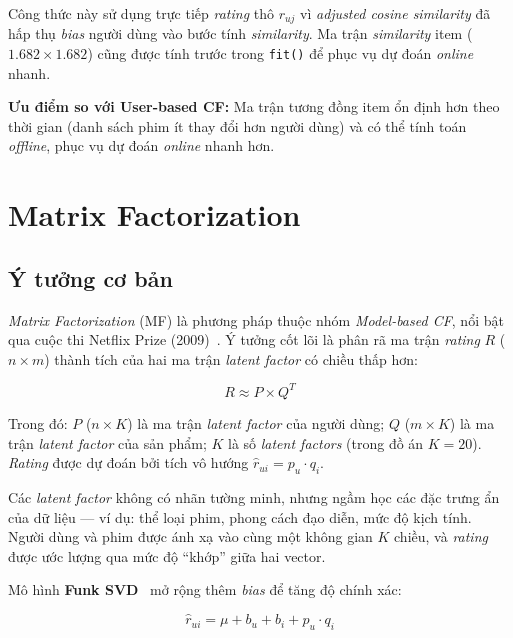 \documentclass[../BTL.tex]{subfiles}
\begin{document}
Công thức này sử dụng trực tiếp \textit{rating} thô $r_{uj}$ vì
\textit{adjusted cosine similarity} đã hấp thụ \textit{bias} người dùng vào bước
tính \textit{similarity}. Ma trận \textit{similarity} item ($1.682 \times 1.682$)
cũng được tính trước trong \texttt{fit()} để phục vụ dự đoán \textit{online} nhanh.

\textbf{Ưu điểm so với User-based CF:} Ma trận tương đồng item ổn định hơn theo thời
gian (danh sách phim ít thay đổi hơn người dùng) và có thể tính toán
\textit{offline}, phục vụ dự đoán \textit{online} nhanh hơn.

\section{Matrix Factorization}
\label{section:2.3}

\subsection{Ý tưởng cơ bản}
\label{section:2.3.1}

\textit{Matrix Factorization} (MF) là phương pháp thuộc nhóm \textit{Model-based CF},
nổi bật qua cuộc thi Netflix Prize (2009)~\cite{koren2009matrix}. Ý tưởng cốt lõi là
phân rã ma trận \textit{rating} $R$ ($n \times m$) thành tích của hai ma trận
\textit{latent factor} có chiều thấp hơn:

\begin{equation}
    R \approx P \times Q^T
    \label{eq:mf}
\end{equation}

Trong đó: $P$ ($n \times K$) là ma trận \textit{latent factor} của người dùng;
$Q$ ($m \times K$) là ma trận \textit{latent factor} của sản phẩm; $K$ là số
\textit{latent factors} (trong đồ án $K = 20$). \textit{Rating} được dự đoán bởi
tích vô hướng $\hat{r}_{ui} = p_u \cdot q_i$.

Các \textit{latent factor} không có nhãn tường minh, nhưng ngầm học các đặc trưng
ẩn của dữ liệu — ví dụ: thể loại phim, phong cách đạo diễn, mức độ kịch tính.
Người dùng và phim được ánh xạ vào cùng một không gian $K$ chiều, và
\textit{rating} được ước lượng qua mức độ ``khớp'' giữa hai vector.

Mô hình \textbf{Funk SVD}~\cite{funk2006netflix} mở rộng thêm \textit{bias} để tăng
độ chính xác:

\begin{equation}
    \hat{r}_{ui} = \mu + b_u + b_i + p_u \cdot q_i
    \label{eq:funk_svd}
\end{equation}
\end{document}

